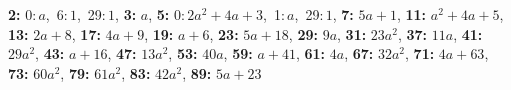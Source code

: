 \textsf{\bfseries 2:} 0:\,$a$,\ 6:\,$1$,\ 29:\,$1$, \textsf{\bfseries 3:} $a$, \textsf{\bfseries 5:} 0:\,$2a^2 + 4a + 3$,\ 1:\,$a$,\ 29:\,$1$, \textsf{\bfseries 7:} $5a + 1$, \textsf{\bfseries 11:} $a^2 + 4a + 5$, \textsf{\bfseries 13:} $2a + 8$, \textsf{\bfseries 17:} $4a + 9$, \textsf{\bfseries 19:} $a + 6$, \textsf{\bfseries 23:} $5a + 18$, \textsf{\bfseries 29:} $9a$, \textsf{\bfseries 31:} $23a^2$, \textsf{\bfseries 37:} $11a$, \textsf{\bfseries 41:} $29a^2$, \textsf{\bfseries 43:} $a + 16$, \textsf{\bfseries 47:} $13a^2$, \textsf{\bfseries 53:} $40a$, \textsf{\bfseries 59:} $a + 41$, \textsf{\bfseries 61:} $4a$, \textsf{\bfseries 67:} $32a^2$, \textsf{\bfseries 71:} $4a + 63$, \textsf{\bfseries 73:} $60a^2$, \textsf{\bfseries 79:} $61a^2$, \textsf{\bfseries 83:} $42a^2$, \textsf{\bfseries 89:} $5a + 23$